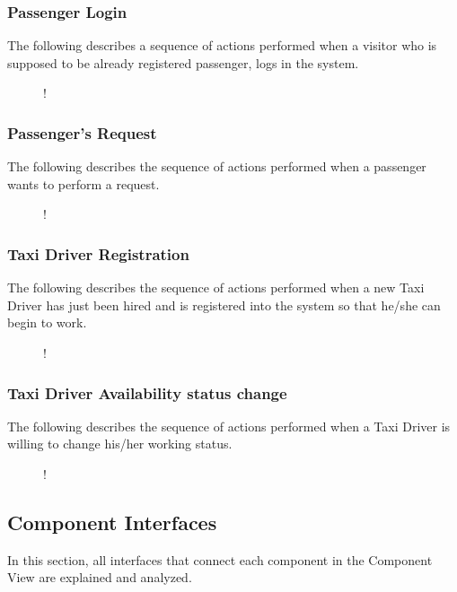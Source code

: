 \subsubsection{Passenger Login}
The following describes a sequence of actions performed when a visitor who is supposed to be already registered passenger, logs in the system. 
\begin{figure}[H]
	\small
	\centering
	\resizebox{6in}
	{!}{}
	\end{figure}
\break
\subsubsection{Passenger's Request}
The following describes the sequence of actions performed when a passenger wants to perform a request. 
\begin{figure}[H]
	\small
	\centering
	\resizebox{6in}
	{!}{}
\end{figure}
\break
\subsubsection{Taxi Driver Registration}
The following describes the sequence of actions performed when a new Taxi Driver has just been hired and is registered into the system so that he/she can begin to work.
\begin{figure}[H]
	\small
	\centering
	\resizebox{6in}
	{!}{}
\end{figure}
\break
\subsubsection{Taxi Driver Availability status change}
The following describes the sequence of actions performed when a Taxi Driver is willing to change his/her working status.
\begin{figure}[H]
	\small
	\centering
	\resizebox{6in}
	{!}{}
\end{figure}
\subsection{Component Interfaces}
\label{sec:interfaces}
In this section, all interfaces that connect each component in the Component View are explained and analyzed.
